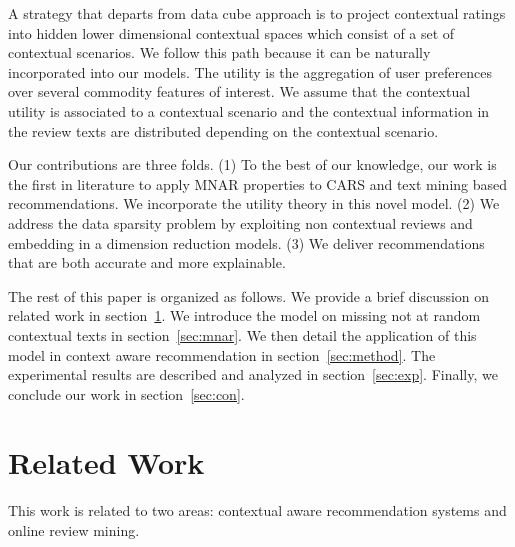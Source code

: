 \documentclass{llncs}
\begin{document}
A strategy that departs from data cube approach is to project contextual ratings into hidden lower dimensional contextual spaces which consist of a set of contextual scenarios. We follow this path because it can be naturally incorporated into our models. The utility is the aggregation of user preferences over several commodity features of interest.  We assume that the contextual utility is associated to a contextual scenario and the contextual information in the review texts are distributed depending on the contextual scenario.  



Our contributions are three folds. (1) To the best of our knowledge, our work is the first in literature to apply MNAR properties to CARS and text mining based recommendations.  We incorporate the utility theory in this novel model. (2) We address the data sparsity problem by exploiting non contextual reviews and embedding in a dimension reduction models. (3) We deliver recommendations that are both accurate and more explainable. 


The rest of this paper is organized as follows. We provide a brief discussion on related work in section~\ref{sec:related}. We introduce the model on missing not at random contextual texts in section~\ref{sec:mnar}. We then detail the application of this model in context aware recommendation in section~\ref{sec:method}. The experimental results are described and analyzed in section~\ref{sec:exp}. Finally, we conclude our work in section~\ref{sec:con}.

\section{Related Work}\label{sec:related}
This work is related to two areas: contextual aware recommendation systems and online review mining.
\end{document}
